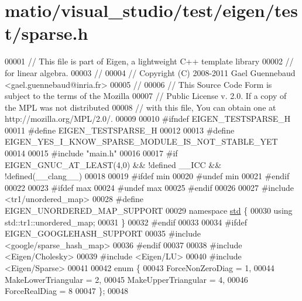 \hypertarget{matio_2visual__studio_2test_2eigen_2test_2sparse_8h_source}{}\section{matio/visual\+\_\+studio/test/eigen/test/sparse.h}
\label{matio_2visual__studio_2test_2eigen_2test_2sparse_8h_source}

\begin{DoxyCode}
00001 \textcolor{comment}{// This file is part of Eigen, a lightweight C++ template library}
00002 \textcolor{comment}{// for linear algebra.}
00003 \textcolor{comment}{//}
00004 \textcolor{comment}{// Copyright (C) 2008-2011 Gael Guennebaud <gael.guennebaud@inria.fr>}
00005 \textcolor{comment}{//}
00006 \textcolor{comment}{// This Source Code Form is subject to the terms of the Mozilla}
00007 \textcolor{comment}{// Public License v. 2.0. If a copy of the MPL was not distributed}
00008 \textcolor{comment}{// with this file, You can obtain one at http://mozilla.org/MPL/2.0/.}
00009 
00010 \textcolor{preprocessor}{#ifndef EIGEN\_TESTSPARSE\_H}
00011 \textcolor{preprocessor}{#define EIGEN\_TESTSPARSE\_H}
00012 
00013 \textcolor{preprocessor}{#define EIGEN\_YES\_I\_KNOW\_SPARSE\_MODULE\_IS\_NOT\_STABLE\_YET}
00014 
00015 \textcolor{preprocessor}{#include "main.h"}
00016 
00017 \textcolor{preprocessor}{#if EIGEN\_GNUC\_AT\_LEAST(4,0) && !defined \_\_ICC && !defined(\_\_clang\_\_)}
00018 
00019 \textcolor{preprocessor}{#ifdef min}
00020 \textcolor{preprocessor}{#undef min}
00021 \textcolor{preprocessor}{#endif}
00022 
00023 \textcolor{preprocessor}{#ifdef max}
00024 \textcolor{preprocessor}{#undef max}
00025 \textcolor{preprocessor}{#endif}
00026 
00027 \textcolor{preprocessor}{#include <tr1/unordered\_map>}
00028 \textcolor{preprocessor}{#define EIGEN\_UNORDERED\_MAP\_SUPPORT}
00029 \textcolor{keyword}{namespace }\hyperlink{namespacestd}{std} \{
00030   \textcolor{keyword}{using} std::tr1::unordered\_map;
00031 \}
00032 \textcolor{preprocessor}{#endif}
00033 
00034 \textcolor{preprocessor}{#ifdef EIGEN\_GOOGLEHASH\_SUPPORT}
00035 \textcolor{preprocessor}{  #include <google/sparse\_hash\_map>}
00036 \textcolor{preprocessor}{#endif}
00037 
00038 \textcolor{preprocessor}{#include <Eigen/Cholesky>}
00039 \textcolor{preprocessor}{#include <Eigen/LU>}
00040 \textcolor{preprocessor}{#include <Eigen/Sparse>}
00041 
00042 \textcolor{keyword}{enum} \{
00043   ForceNonZeroDiag = 1,
00044   MakeLowerTriangular = 2,
00045   MakeUpperTriangular = 4,
00046   ForceRealDiag = 8
00047 \};
00048 

\end{DoxyCode}
